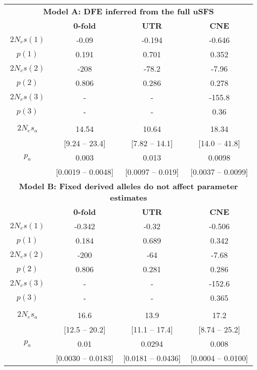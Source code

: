 \begin{table}[H]
\begin{tabular}{cccc}
\toprule
          \multicolumn{4}{c}{\textbf{Model A: DFE inferred from the full uSFS}} \\
                  &     \textbf{0-fold} &        \textbf{UTR} &        \textbf{CNE} \\ \hline
                  $2N_es(1)$ &      -0.09 &     -0.194 &     -0.646 \\
                  $p(1)$ &      0.191 &      0.701 &      0.352 \\
                  $2N_es(2)$ &       -208 &      -78.2 &      -7.96 \\
                  $p(2)$ &      0.806 &      0.286 &      0.278 \\
                  $2N_es(3)$ &          - &          - &     -155.8 \\
                  $p(3)$ &          - &          - &       0.36 \\
                            &            &            &            \\
                  $2N_es_a$ &      14.54 &      10.64 &      18.34 \\
				            & [9.24 – 23.4] & [7.82 – 14.1] & [14.0 – 41.8] \\
                  $p_a$ &      0.003 &      0.013 &     0.0098 \\
							& [0.0019 – 0.0048] & [0.0097 – 0.019] & [0.0037 – 0.0099] \\ \midrule
\multicolumn{4}{c}{\textbf{Model B: Fixed derived alleles do not affect parameter estimates}}  \\ 
                  &     \textbf{0-fold} &        \textbf{UTR} &        \textbf{CNE} \\ \hline
                 $2N_es(1)$ &     -0.342 &      -0.32 &     -0.506 \\
                 $p(1)$ &      0.184 &      0.689 &      0.342 \\
                 $2N_es(2)$ &       -200 &        -64 &      -7.68 \\
                 $p(2)$ &      0.806 &      0.281 &      0.286 \\
                 $2N_es(3)$ &          - &          - &     -152.6 \\
                 $p(3)$ &          - &          - &      0.365 \\
                 &        	   &            &            \\
                 $2N_es_a$  &       16.6 &       13.9 &       17.2 \\
				& [12.5 – 20.2] & [11.1 – 17.4] & [8.74 – 25.2] \\
				$p_a$  &       0.01 &     0.0294 &      0.008 \\
				& [0.0030 – 0.0183] & [0.0181 – 0.0436] & [0.0004 – 0.0100] \\
\bottomrule
\end{tabular}
\label{tab:DFEestimates}
\end{table}